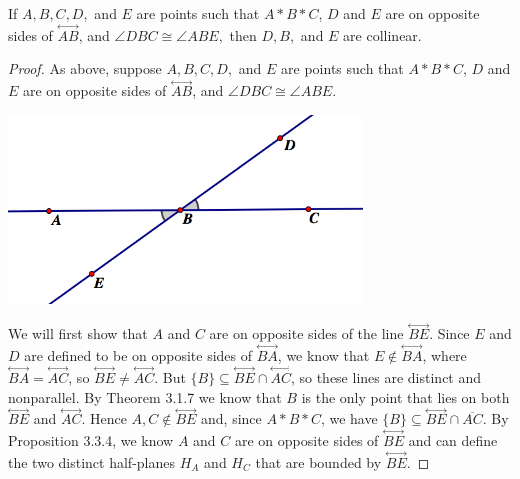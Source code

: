 \documentclass{article}
\newenvironment{problem1}[1]{\noindent {\bf Problem #1:}}
{\medskip}
\renewcommand{\line}[1]{\stackrel{\longleftrightarrow}{#1}}
\newcommand{\seg}[1]{\overline{#1}}
\begin{document}
\begin{problem1}{6} If $A,B,C,D,$ and $E$ are points such that $A*B*C$, $D$ and $E$ are on opposite sides of $\line{AB}$, and $\angle{DBC}\cong\angle{ABE},$ then $D, B,$ and $E$ are collinear. \end{problem1}
\begin{proof} As above, suppose $A,B,C,D,$ and $E$ are points such that $A*B*C$, $D$ and $E$ are on opposite sides of $\line{AB}$, and $\angle{DBC}\cong\angle{ABE}.$ 
\begin{center}
\includegraphics[width=3.7in]{S3_5_6.png}
\end{center} We will first show that $A$ and $C$ are on opposite sides of the line $\line{BE}$. Since $E$ and $D$ are defined to be on opposite sides of $\line{BA}$, we know that $E\notin\line{BA}$, where $\line{BA}=\line{AC}$, so $\line{BE}\ne\line{AC}$. But $\{B\}\subseteq\line{BE}\cap\line{AC}$, so these lines are distinct and nonparallel. By Theorem 3.1.7 we know that $B$ is the only point that lies on both $\line{BE}$ and $\line{AC}$. Hence $A,C\notin\line{BE}$ and, since $A*B*C$, we have $\{B\}\subseteq\line{BE}\cap\seg{AC}$. By Proposition 3.3.4, we know $A$ and $C$ are on opposite sides of $\line{BE}$ and can define the two distinct half-planes $H_A$ and $H_C$ that are bounded by $\line{BE}$.


\end{proof}
\end{document}
